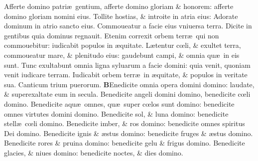 \documentclass[a5paper,10pt]{book}
\def\rightmarginnote{%
	\lrmarginnote{\hskip\columnwidth \hskip -1em}}
\def\ae{æ}
\def\oe{œ}
\begin{document}
\begin{multicols*}{2}
\newline \color{red} A\color{black}fferte domino patri\ae \ gentium, afferte domino gloriam \& honorem: afferte domino gloriam nomini eius.
\newline \color{red} T\color{black}ollite hostias, \& introite in atria eius: Adorate dominum in atrio sancto eius.
\newline \color{red} C\color{black}ommoueatur a facie eius vniuersa terra. Dicite in gentibus quia dominus regnauit.
\newline \color{red} E\color{black}tenim correxit orbem terr\ae \ qui non commouebitur: iudicabit populos in \ae quitate.
\newline \color{red} L\color{black}\ae tentur c\oe li, \& exultet terra, commoueatur mare, \& plenitudo eius: gaudebunt campi, \& omnia qu\ae \ in eis sunt.
\newline \color{red} T\color{black}unc exultabunt omnia ligna syluarum a facie domini: quia venit, quoniam venit iudicare terram.
\newline \color{red} I\color{black}udicabit orbem terr\ae \ in \ae quitate, \& populos in veritate sua.
\newline \color{red} \hypertarget{benedicite}{Canticum} trium puerorum. \color{black}
\vspace{-1em}
\lettrine[lines=2]{\bfseries \color{red} B}{}Enedicite\rightmarginnote{Dan.\\3.} omnia opera domini domino: laudate, \& superexaltate eum in secula.
\newline \color{red} B\color{black}enedicite angeli domini domino, benedicite c\oe li domino.
\newline \color{red} B\color{black}enedicite aqu\ae \ omnes, qu\ae \ super c\oe los sunt domino: benedicite omnes virtutes domini domino.
\newline \color{red} B\color{black}enedicite sol, \& luna domino: benedicite stell\ae \ c\oe li domino.
\newline \color{red} B\color{black}enedicite imber, \& ros domino: benedicite omnes spiritus Dei domino.
\newline \color{red} B\color{black}enedicite ignis \& \ae stus domino: benedicite fruges \& \ae stus domino.
\newline \color{red} B\color{black}enedicite rores \& pruina domino: benedicite gelu \& frigus domino.
\newline \color{red} B\color{black}enedicite glacies, \& niues domino: benedicite noctes, \& dies domino.

\end{multicols*}
\end{document}
